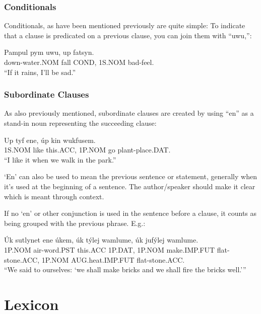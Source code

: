 \documentclass{book}
\begin{document}
\section{Conditionals}
Conditionals, as have been mentioned previously are quite simple:
To indicate that a clause is predicated on a previous clause, you
can join them with ``uwu,'':

\begin{exe}
    \ex
    \gll Pampul pym uwu, up fatsyn.\\
    down-water.NOM fall COND, 1S.NOM bad-feel. \\
    \glt ``If it rains, I'll be sad.''
\end{exe}


\section{Subordinate Clauses}
As also previously mentioned, subordinate clauses are created by
using ``en'' as a stand-in noun representing the succeeding clause:

\begin{exe}
    \ex
    \gll Up tyf ene, úp kin wukfusem.\\
    1S.NOM like this.ACC, 1P.NOM go plant-place.DAT. \\
    \glt ``I like it when we walk in the park.''
\end{exe}

`En' can also be used to mean the previous sentence or statement, generally when it's 
used at the beginning of a sentence. The author/speaker should make it clear which is
meant through context.

If no `en' or other conjunction is used in the sentence before a clause,
it counts as being grouped with the previous phrase.
E.g.:

\begin{exe}
    \ex
    \gll Úk sutlynet ene úkem, úk týlej wamlume, úk jufýlej wamlume.\\
    1P.NOM air-word.PST this.ACC 1P.DAT, 1P.NOM make.IMP.FUT flat-stone.ACC, 1P.NOM AUG.heat.IMP.FUT flat-stone.ACC. \\
    \glt ``We said to ourselves: `we shall make bricks and we shall fire the bricks well.'''
\end{exe}



\part{Lexicon}
\end{document}
